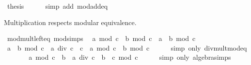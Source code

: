 \begin{isabellebody}
\ {\isacharquery}{\kern0pt}thesis\isanewline
\ \ \ \ \isamarkupfalse%
\ {\isacharparenleft}{\kern0pt}simp\ add{\isacharcolon}{\kern0pt}\ mod{\isacharunderscore}{\kern0pt}add{\isacharunderscore}{\kern0pt}eq{\isacharparenright}{\kern0pt}\isanewline
{}\isamarkupfalse%
%
\endisatagproof
{\isafoldproof}%
%
\isadelimproof
%
\endisadelimproof
%
\begin{isamarkuptext}%
Multiplication respects modular equivalence.%
\end{isamarkuptext}\isamarkuptrue%
\isamarkupfalse%
\ mod{\isacharunderscore}{\kern0pt}mult{\isacharunderscore}{\kern0pt}left{\isacharunderscore}{\kern0pt}eq\ {\isacharbrackleft}{\kern0pt}mod{\isacharunderscore}{\kern0pt}simps{\isacharbrackright}{\kern0pt}{\isacharcolon}{\kern0pt}\isanewline
\ \ {\isachardoublequoteopen}{\isacharparenleft}{\kern0pt}{\isacharparenleft}{\kern0pt}a\ mod\ c{\isacharparenright}{\kern0pt}\ {\isacharasterisk}{\kern0pt}\ b{\isacharparenright}{\kern0pt}\ mod\ c\ {\isacharequal}{\kern0pt}\ {\isacharparenleft}{\kern0pt}a\ {\isacharasterisk}{\kern0pt}\ b{\isacharparenright}{\kern0pt}\ mod\ c{\isachardoublequoteclose}\isanewline
%
\isadelimproof
%
\endisadelimproof
%
\isatagproof
{}\isamarkupfalse%
\ {\isacharminus}{\kern0pt}\isanewline
\ \ \isamarkupfalse%
\ {\isachardoublequoteopen}{\isacharparenleft}{\kern0pt}a\ {\isacharasterisk}{\kern0pt}\ b{\isacharparenright}{\kern0pt}\ mod\ c\ {\isacharequal}{\kern0pt}\ {\isacharparenleft}{\kern0pt}{\isacharparenleft}{\kern0pt}a\ div\ c\ {\isacharasterisk}{\kern0pt}\ c\ {\isacharplus}{\kern0pt}\ a\ mod\ c{\isacharparenright}{\kern0pt}\ {\isacharasterisk}{\kern0pt}\ b{\isacharparenright}{\kern0pt}\ mod\ c{\isachardoublequoteclose}\isanewline
\ \ \ \ \isamarkupfalse%
\ {\isacharparenleft}{\kern0pt}simp\ only{\isacharcolon}{\kern0pt}\ div{\isacharunderscore}{\kern0pt}mult{\isacharunderscore}{\kern0pt}mod{\isacharunderscore}{\kern0pt}eq{\isacharparenright}{\kern0pt}\isanewline
\ \ \isamarkupfalse%
\ \isamarkupfalse%
\ {\isachardoublequoteopen}{\isasymdots}\ {\isacharequal}{\kern0pt}\ {\isacharparenleft}{\kern0pt}a\ mod\ c\ {\isacharasterisk}{\kern0pt}\ b\ {\isacharplus}{\kern0pt}\ a\ div\ c\ {\isacharasterisk}{\kern0pt}\ b\ {\isacharasterisk}{\kern0pt}\ c{\isacharparenright}{\kern0pt}\ mod\ c{\isachardoublequoteclose}\isanewline
\ \ \ \ \isamarkupfalse%
\ {\isacharparenleft}{\kern0pt}simp\ only{\isacharcolon}{\kern0pt}\ algebra{\isacharunderscore}{\kern0pt}simps{\isacharparenright}{\kern0pt}\isanewline

\end{isabellebody}
